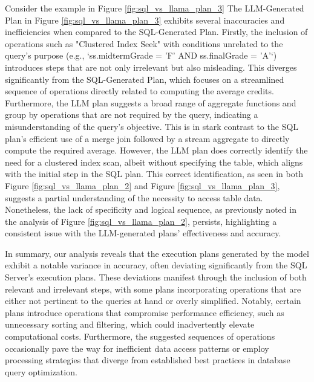 Consider the example in Figure \ref{fig:sql_vs_llama_plan_3} The LLM-Generated Plan in Figure \ref{fig:sql_vs_llama_plan_3} exhibits several inaccuracies and inefficiencies when compared to the SQL-Generated Plan. Firstly, the inclusion of operations such as "Clustered Index Seek" with conditions unrelated to the query's purpose (e.g., `ss.midtermGrade = 'F' AND ss.finalGrade = 'A'`) introduces steps that are not only irrelevant but also misleading. This diverges significantly from the SQL-Generated Plan, which focuses on a streamlined sequence of operations directly related to computing the average credits. Furthermore, the LLM plan suggests a broad range of aggregate functions and group by operations that are not required by the query, indicating a misunderstanding of the query's objective. This is in stark contrast to the SQL plan's efficient use of a merge join followed by a stream aggregate to directly compute the required average. However, the LLM plan does correctly identify the need for a clustered index scan, albeit without specifying the table, which aligns with the initial step in the SQL plan. This correct identification, as seen in both Figure \ref{fig:sql_vs_llama_plan_2} and Figure \ref{fig:sql_vs_llama_plan_3}, suggests a partial understanding of the necessity to access table data. Nonetheless, the lack of specificity and logical sequence, as previously noted in the analysis of Figure \ref{fig:sql_vs_llama_plan_2}, persists, highlighting a consistent issue with the LLM-generated plans' effectiveness and accuracy.

In summary, our analysis reveals that the execution plans generated by the model exhibit a notable variance in accuracy, often deviating significantly from the SQL Server's execution plans. These deviations manifest through the inclusion of both relevant and irrelevant steps, with some plans incorporating operations that are either not pertinent to the queries at hand or overly simplified. Notably, certain plans introduce operations that compromise performance efficiency, such as unnecessary sorting and filtering, which could inadvertently elevate computational costs. Furthermore, the suggested sequences of operations occasionally pave the way for inefficient data access patterns or employ processing strategies that diverge from established best practices in database query optimization.


